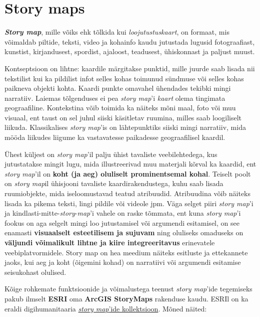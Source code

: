 \documentclass[
]{book}
\begin{document}
\hypertarget{story-maps}{%
\section{Story maps}\label{story-maps}}

\textbf{\emph{Story map}}, mille võiks ehk tõlkida kui \emph{loojutustuskaart}, on formaat, mis võimaldab piltide, teksti, video ja kohainfo kaudu jutustada lugusid fotograafiast, kunstist, kirjandusest, spordist, ajaloost, teadusest, ühiskonnast ja paljust muust.

Kontseptsioon on lihtne: kaardile märgitakse punktid, mille juurde saab lisada nii tekstilist kui ka pildilist infot selles kohas toimunud sündmuse või selles kohas paikneva objekti kohta. Kaardi punkte omavahel ühendades tekibki mingi narratiiv.
Laiemas tõlgenduses ei pea \emph{story map}'i \emph{kaart} olema tingimata geograafiline. Kontekstina võib toimida ka näiteks mõni maal, foto või muu visuaal, ent taust on sel juhul siiski käsitletav ruumina, milles saab loogiliselt liikuda. Klassikalises \emph{story map}'is on lähtepunktiks siiski mingi narratiiv, mida mööda liikudes liigume ka vastavatesse paikadesse geograafilisel kaardil.

Ühest küljest on \emph{story map}'il palju ühist tavaliste veebilehtedega, kus jutustatakse mingit lugu, mida illustreerivad muu materjali kõrval ka kaardid, ent \emph{story map}'il on \textbf{koht (ja aeg) oluliselt prominentsemal kohal}.
Teiselt poolt on \emph{story map}il ühisjooni tavaliste kaardirakendustega, kuhu saab lisada ruumiobjekte, mida iseloomustavad teatud atribuudid. Atribuudina võib näiteks lisada ka pikema teksti, lingi pildile või videole jpm. Väga selget piiri \emph{story map}'i ja kindlasti-mitte-\emph{story}-\emph{map}'i vahele on raske tõmmata, ent kuna \emph{story map}'i fookus on aga selgelt mingi loo jutustamisel või argumendi esitamisel, on see enamasti \textbf{visuaalselt esteetilisem ja sujuvam} ning oluliseks omaduseks on \textbf{väljundi võimalikult lihtne ja kiire integreeritavus} erinevatele veebiplatvormidele.
Story map on hea meedium näiteks esitluste ja ettekannete jaoks, kui aeg ja koht (õigemini kohad) on narratiivi või argumendi esitamise seisukohast olulised.

Kõige rohkemate funktsioonide ja võimalustega teenust \emph{story map}'ide tegemiseks pakub ilmselt \textbf{ESRI} oma \textbf{ArcGIS StoryMaps} rakenduse kaudu. ESRIl on ka eraldi digihumanitaaria \href{https://collections.storymaps.esri.com/humanities/}{\emph{story map}'ide kollektsioon}. Mõned näited:
\end{document}
